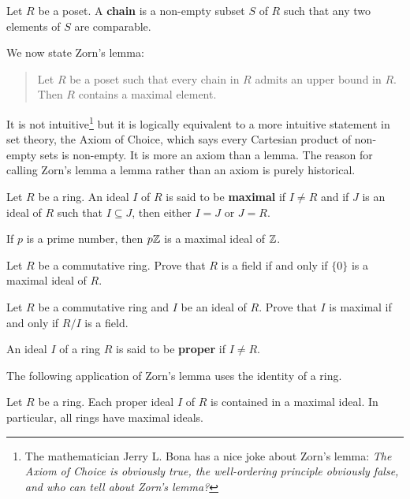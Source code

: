 \begin{definition}
    Let $R$ be a poset. A \textbf{chain} is a non-empty subset $S$ of $R$ such that
    any two elements of $S$ are comparable. 
\end{definition}

We now state Zorn's lemma:

\begin{quote}
Let $R$ be a poset such that 
every chain in $R$ admits an upper bound in $R$. 
Then $R$ contains a maximal element. 
\end{quote}

It is not intuitive\footnote{The mathematician
Jerry L. Bona has a nice joke about Zorn's lemma: 
\emph{The Axiom of Choice is obviously true, 
the well-ordering principle obviously false, and who can tell about Zorn's lemma?}}
but it is logically equivalent to a more 
intuitive statement in set theory, the Axiom of Choice, 
which says every Cartesian product of non-empty sets is non-empty. 
It is more an axiom than a lemma. 
The reason for calling Zorn’s lemma a lemma rather 
than an axiom is purely historical. 

\begin{definition}
	Let $R$ be a ring. An ideal $I$ of $R$ is said to be \textbf{maximal}
	if $I\ne R$ and if $J$ is an ideal of $R$ such that $I\subseteq J$, then 
	either $I=J$ or $J=R$. 
\end{definition}

If $p$ is a prime number, then $p\mathbb{Z}$ is a maximal ideal of $\mathbb{Z}$.

\begin{exercise}
Let $R$ be a commutative ring. Prove that $R$ is a 
field if and only if $\{0\}$ is a maximal ideal of $R$. 	
\end{exercise}

\begin{exercise}
\label{xca:maximal<=>field}
Let $R$ be a commutative ring and $I$ be an ideal of $R$. Prove that $I$ is maximal
if and only if $R/I$ is a field.  	
\end{exercise}

An ideal $I$ of a ring $R$ is said to be \textbf{proper}
if $I\ne R$. 

The following application of Zorn's lemma uses 
the identity of a ring.

\begin{theorem}[Krull]
	Let $R$ be a ring. Each proper ideal $I$ of $R$ 
	is contained in a maximal ideal. 
	In particular, all rings have maximal ideals. 	
\end{theorem}

